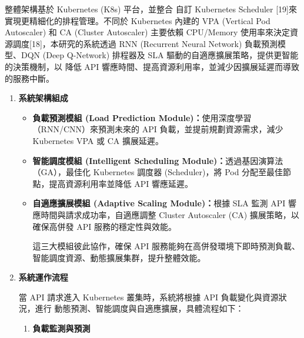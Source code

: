 \documentclass[12pt,a4paper]{article}
\begin{document}
\begin{enumerate}[label={(\zhdig*)}, leftmargin=2\parindent, listparindent=\parindent]
\begin{enumerate}[label={(\arabic*)}, leftmargin=\parindent, listparindent=\parindent]
整體架構基於 Kubernetes (K8s) 平台，並整合 自訂 Kubernetes Scheduler [19]來實現更精細化的排程管理。不同於 Kubernetes 內建的 VPA (Vertical Pod Autoscaler) 和 CA (Cluster Autoscaler) 主要依賴 CPU/Memory 使用率來決定資源調度[18]，本研究的系統透過 RNN (Recurrent Neural Network) 負載預測模型、DQN (Deep Q-Network) 排程器及 SLA 驅動的自適應擴展策略，提供更智能的決策機制，以 降低 API 響應時間、提高資源利用率，並減少因擴展延遲而導致的服務中斷。
\begin{enumerate}[label={(\zhdig*)}, leftmargin=\parindent, listparindent=\parindent]
\item \textbf{
系統架構組成}

\begin{itemize}[leftmargin=\parindent, listparindent=\parindent]
\\本系統架構主要包含三大核心模組，各自負責不同層級的優化：

\item \textbf{負載預測模組 (Load Prediction Module)：}使用深度學習（RNN/CNN）來預測未來的 API 負載，並提前規劃資源需求，減少 Kubernetes VPA 或 CA 擴展延遲。
\item \textbf{智能調度模組 (Intelligent Scheduling Module)：}透過基因演算法（GA），最佳化 Kubernetes 調度器 (Scheduler)，將 Pod 分配至最佳節點，提高資源利用率並降低 API 響應延遲。
\item \textbf{自適應擴展模組 (Adaptive Scaling Module)：}根據 SLA 監測 API 響應時間與請求成功率，自適應調整 Cluster Autoscaler (CA) 擴展策略，以確保高併發 API 服務的穩定性與效能。

這三大模組彼此協作，確保 API 服務能夠在高併發環境下即時預測負載、智能調度資源、動態擴展集群，提升整體效能。

\end{itemize}
    \item \textbf{
系統運作流程}

當 API 請求進入 Kubernetes 叢集時，系統將根據 API 負載變化與資源狀況，進行 動態預測、智能調度與自適應擴展，具體流程如下：
\begin{enumerate}[label={(\arabic*)}, leftmargin=\parindent, listparindent=\parindent]

    \item\textbf{
負載監測與預測}
\begin{itemize}[leftmargin=\parindent, listparindent=\parindent]


\end{itemize}
\end{enumerate}
\end{enumerate}
\end{enumerate}
\end{enumerate}
\end{document}
